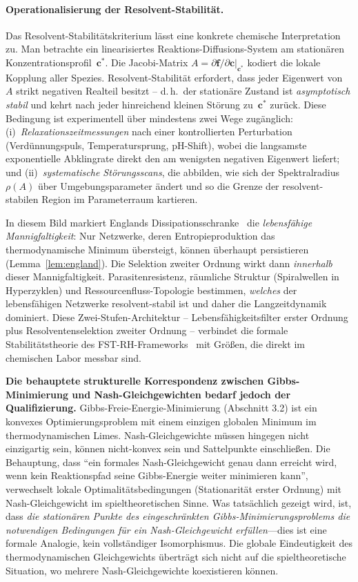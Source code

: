 \documentclass[12pt,a4paper]{article}
\theoremstyle{remark}
\begin{document}
\paragraph{Operationalisierung der Resolvent-Stabilit\"at.}
Das Resolvent-Stabilit\"atskriterium l\"asst eine konkrete chemische
Interpretation zu.  Man betrachte ein linearisiertes Reaktions-Diffusions-System
am station\"aren Konzentrationsprofil~$\mathbf{c}^{*}$.  Die Jacobi-Matrix
$A = \partial \mathbf{f}/\partial \mathbf{c}\big|_{\mathbf{c}^{*}}$
kodiert die lokale Kopplung aller Spezies.  Resolvent-Stabilit\"at erfordert,
dass jeder Eigenwert von~$A$ strikt negativen Realteil besitzt -- d.\,h.\ der
station\"are Zustand ist \emph{asymptotisch stabil} und kehrt nach jeder
hinreichend kleinen St\"orung zu~$\mathbf{c}^{*}$ zur\"uck.
Diese Bedingung ist experimentell \"uber mindestens zwei Wege zug\"anglich:
(i)~\emph{Relaxationszeitmessungen} nach einer kontrollierten Perturbation
(Verd\"unnungspuls, Temperatursprung, pH-Shift), wobei die langsamste
exponentielle Abklingrate direkt den am wenigsten negativen Eigenwert liefert;
und (ii)~\emph{systematische St\"orungsscans}, die abbilden, wie sich der
Spektralradius~$\rho(A)$ \"uber Umgebungsparameter \"andert und so die Grenze der
resolvent-stabilen Region im Parameterraum kartieren.

In diesem Bild markiert Englands Dissipationsschranke~\citep{England2013} die
\emph{lebensfähige Mannigfaltigkeit}: Nur Netzwerke, deren Entropieproduktion
das thermodynamische Minimum \"ubersteigt, k\"onnen \"uberhaupt persistieren
(Lemma~\ref{lem:england}).  Die Selektion zweiter Ordnung wirkt dann
\emph{innerhalb} dieser Mannigfaltigkeit.  Parasitenresistenz, r\"aumliche
Struktur (Spiralwellen in Hyperzyklen) und Ressourcenfluss-Topologie bestimmen,
\emph{welches} der lebensfähigen Netzwerke resolvent-stabil ist und daher die
Langzeitdynamik dominiert.
Diese Zwei-Stufen-Architektur -- Lebensfähigkeitsfilter erster Ordnung plus
Resolventenselektion zweiter Ordnung -- verbindet die formale Stabilit\"atstheorie
des FST-RH-Frameworks~\citep{GeigerRH2026b} mit Gr\"o\ss{}en, die direkt im
chemischen Labor messbar sind.

\textbf{Die behauptete strukturelle Korrespondenz zwischen Gibbs-Minimierung und Nash-Gleichgewichten bedarf jedoch der Qualifizierung.} Gibbs-Freie-Energie-Minimierung (Abschnitt 3.2) ist ein konvexes Optimierungsproblem mit einem einzigen globalen Minimum im thermodynamischen Limes. Nash-Gleichgewichte m\"ussen hingegen nicht einzigartig sein, k\"onnen nicht-konvex sein und Sattelpunkte einschlie\ss{}en. Die Behauptung, dass ``ein formales Nash-Gleichgewicht genau dann erreicht wird, wenn kein Reaktionspfad seine Gibbs-Energie weiter minimieren kann'', verwechselt lokale Optimalit\"atsbedingungen (Stationarit\"at erster Ordnung) mit Nash-Gleichgewicht im spieltheoretischen Sinne. Was tats\"achlich gezeigt wird, ist, dass \emph{die station\"aren Punkte des eingeschr\"ankten Gibbs-Minimierungsproblems die notwendigen Bedingungen f\"ur ein Nash-Gleichgewicht erf\"ullen}---dies ist eine formale Analogie, kein vollst\"andiger Isomorphismus. Die globale Eindeutigkeit des thermodynamischen Gleichgewichts \"ubertr\"agt sich nicht auf die spieltheoretische Situation, wo mehrere Nash-Gleichgewichte koexistieren k\"onnen.
\end{document}
